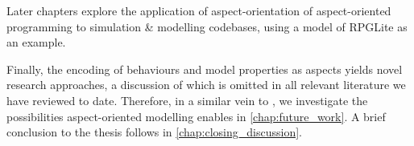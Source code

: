 Later chapters explore the application of aspect-orientation of aspect-oriented
programming to simulation \& modelling codebases, using a model of RPGLite as an
example.

Finally, the encoding of behaviours and model properties as aspects yields novel
research approaches, a discussion of which is omitted in all relevant literature
we have reviewed to date. Therefore, in a similar vein to
\citet{marsh1994formalising}, we investigate the possibilities aspect-oriented
modelling enables in \cref{chap:future_work}. A brief conclusion to the thesis
follows in \cref{chap:closing_discussion}.







